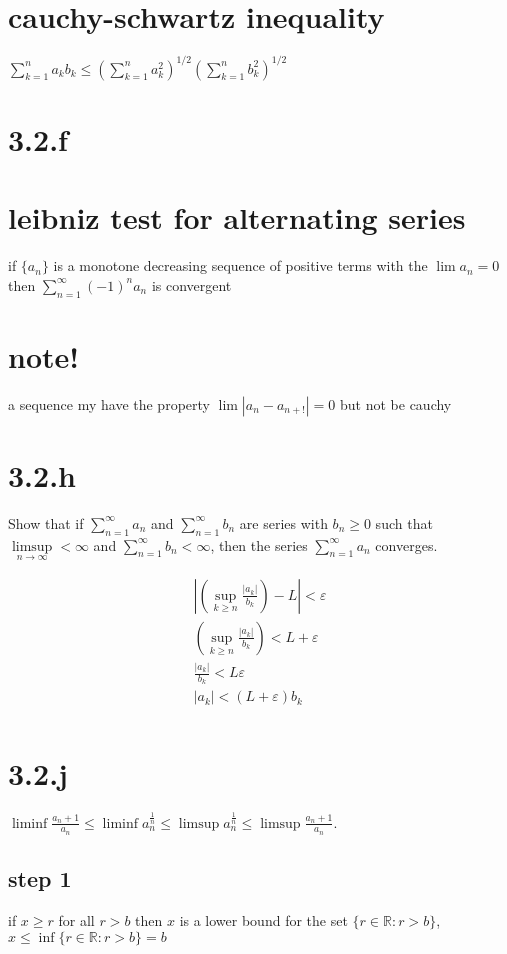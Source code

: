 \documentclass[letterpaper]{article}
\begin{document}
\section*{cauchy-schwartz inequality}
$\sum\limits_{k=1}^n{a_kb_k}\le \left(\sum\limits_{k=1}^n{a_k^2}\right)^{1/2}\left(\sum\limits_{k=1}^n{b_k^2}\right)^{1/2}$

\section*{3.2.f}

\section*{leibniz test for alternating series}
if $\{a_n\}$ is a monotone decreasing sequence of positive terms with the $\lim a_n=0$ then $\sum\limits_{n=1}^\infty{(-1)^na_n}$ is convergent

\section*{note!} a sequence my have the property $\lim |a_n-a_{n+!}|=0$ but not be cauchy
\section*{3.2.h}
Show that if $\sum\limits_{n=1}^\infty{a_n}$ and $\sum\limits_{n=1}^\infty{b_n}$ are series with $b_n\ge 0$ such that $\limsup\limits_{n\to\infty}<\infty$ and $\sum\limits_{n=1}^\infty{b_n}<\infty$, then the series $\sum\limits_{n=1}^\infty{a_n}$ converges.

\begin{align*}
  \left\lvert\left(\sup\limits_{k\ge n}\frac{|a_k|}{b_k}\right)-L\right\rvert<\varepsilon\\
  \left(\sup\limits_{k\ge n}\frac{|a_k|}{b_k}\right)<L+\varepsilon\\
  \frac{|a_k|}{b_k}<L\varepsilon\\
  |a_k|<(L+\varepsilon) b_k\\
\end{align*}
\section*{3.2.j}
$\liminf\frac{a_n+1}{a_n}\le\liminf{a_n^{\frac{1}{n}}}\le\limsup a_n^{\frac{1}{n}}\le \limsup\frac{a_n+1}{a_n}$.
\subsection*{step 1}
if $x\ge r$ for all $r>b$ then $x$ is a lower bound for the set $\{r\in \mathbb{R}:r>b\}$, $x\le\inf\{r\in\mathbb{R}:r>b\}=b$
\end{document}

